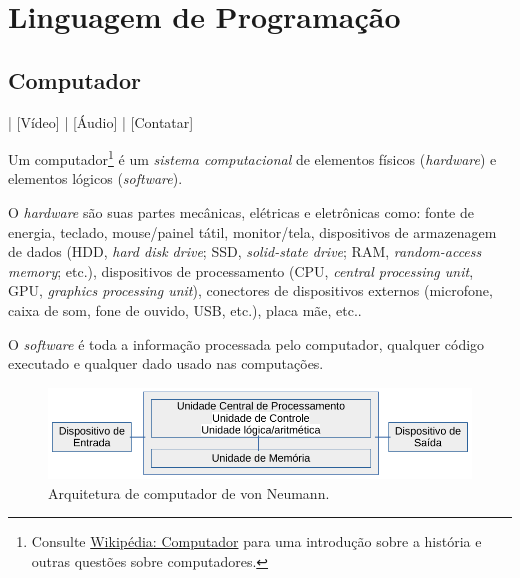 
\chapter{Linguagem de Programação}\label{cap_lingua}
\thispagestyle{fancy}

\section{Computador}\label{cap_lim_sec_computador}

\begin{flushright}
  [YouTube] | [Vídeo] | [Áudio] | [Contatar]
\end{flushright}

Um computador\footnote{Consulte \href{https://pt.wikipedia.org/wiki/Computador}{Wikipédia: Computador} para uma introdução sobre a história e outras questões sobre computadores.} é um \emph{sistema computacional} de elementos físicos (\emph{hardware}) e elementos lógicos (\emph{software}).

O \emph{hardware} são suas partes mecânicas, elétricas e eletrônicas como: fonte de energia, teclado, mouse/painel tátil, monitor/tela, dispositivos de armazenagem de dados (HDD, {\it hard disk drive}; SSD, {\it solid-state drive}; RAM, {\it random-access memory}; etc.), dispositivos de processamento (CPU, {\it central processing unit}, GPU, {\it graphics processing unit}), conectores de dispositivos externos (microfone, caixa de som, fone de ouvido, USB, etc.), placa mãe, etc..

O \emph{software} é toda a informação processada pelo computador, qualquer código executado e qualquer dado usado nas computações.

\begin{figure}[H]
  \centering
  \includegraphics[width=\textwidth]{./cap_lingua/dados/fig_arqVonNeumann/main}
  \caption[Arquitetura de von Neumann]{Arquitetura de computador de von Neumann.}
  \label{cap_lim_sec_computador:fig:arqVonNeumann}
\end{figure}

